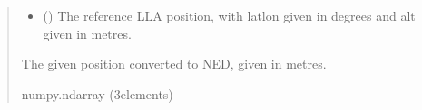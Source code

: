 \documentclass[letterpaper,10pt,english]{sphinxmanual}
\begin{document}
\begin{fulllineitems}
\begin{quote}
\begin{description}
\begin{itemize}
\item {} 
\sphinxAtStartPar
{} (\sphinxstyleliteralemphasis{\sphinxupquote{ (}}\sphinxstyleliteralemphasis{\sphinxupquote{)}}) \textendash{} The reference LLA position, with lat\sphinxhyphen{}lon given in degrees
and alt given in metres.

\end{itemize}

\sphinxAtStartPar
The given position converted to NED, given in metres.

\sphinxAtStartPar
numpy.ndarray (3\sphinxhyphen{}elements)

\end{description}\end{quote}

\end{fulllineitems}

\end{document}
